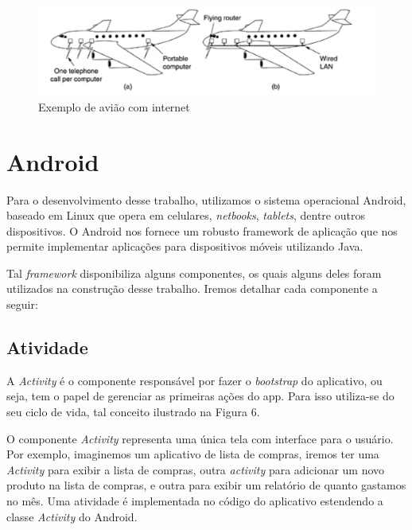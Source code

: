 \documentclass[12pt, %
openright, 
oneside,
a4paper,
brazil]{facom-ufu-abntex2}
\begin{document}
\begin{figure}[hbt]
  \includegraphics[scale=0.9]{aviao}
  \caption{Exemplo de avião com internet \cite{tanenbaum2003redes}}
\end{figure}



\section{Android}

	Para o desenvolvimento desse trabalho, utilizamos o sistema operacional Android, baseado em Linux que opera em celulares, \emph{netbooks}, \emph{tablets}, dentre outros dispositivos. O Android nos fornece um robusto framework de aplicação que nos permite implementar aplicações para dispositivos móveis utilizando Java.
	
	Tal \emph{framework} disponibiliza alguns componentes, os quais alguns deles foram utilizados na construção desse trabalho.
	Iremos detalhar cada componente a seguir:
	\cite{googleand}
	
	\subsection{Atividade}
	A \emph{Activity} é o componente responsável por fazer o \emph{bootstrap} do aplicativo, ou seja, tem o papel de gerenciar as primeiras ações do app. Para isso utiliza-se do seu ciclo de vida, tal conceito ilustrado na Figura 6.
	
	O componente \emph{Activity} representa uma única tela com interface para o usuário. Por exemplo, imaginemos um aplicativo de lista de compras, iremos ter uma \emph{Activity} para exibir a lista de compras, outra \emph{activity} para adicionar um novo produto na lista de compras, e outra para exibir um relatório de quanto gastamos no mês.
	Uma atividade é implementada no código do aplicativo estendendo a classe \emph{Activity} do Android.
	
\end{document}
